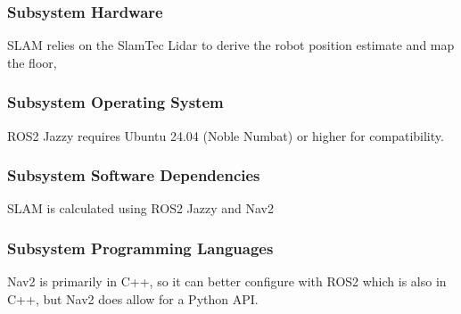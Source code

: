 \subsubsection{Subsystem Hardware}
SLAM relies on the SlamTec Lidar to derive the robot position estimate and map the floor,

\subsubsection{Subsystem Operating System}
ROS2 Jazzy requires Ubuntu 24.04 (Noble Numbat) or higher for compatibility.

\subsubsection{Subsystem Software Dependencies}
SLAM is calculated using ROS2 Jazzy and Nav2

\subsubsection{Subsystem Programming Languages}
Nav2 is primarily in C++, so it can better configure with ROS2 which is also in C++, but Nav2 does allow for a Python API.